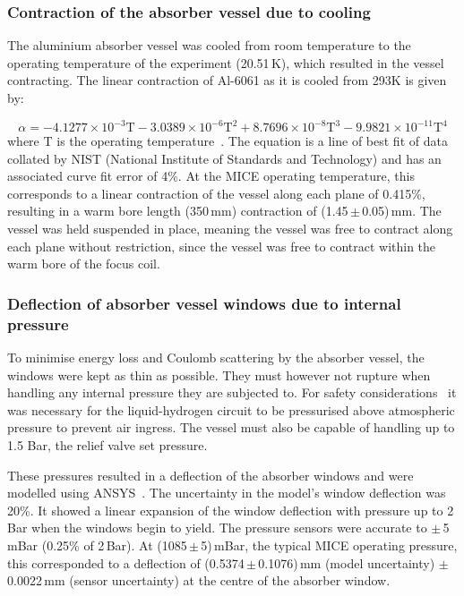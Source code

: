 \subsubsection{Contraction of the absorber vessel due to cooling}
\label{SubSect:Absorber_Contraction}

The aluminium absorber vessel was cooled from room temperature to the operating temperature of the
experiment (20.51\,K), which resulted in the vessel contracting. The linear contraction of
Al-6061 as it is cooled from 293K is given by:

\begin{equation}
  \alpha =-4.1277\times {10}^{-3}\mathrm{T}-3.0389\times {10}^{-6}\mathrm{T}^2+8.7696\times {10}^{-8}\mathrm{T}^3-9.9821\times {10}^{-11}\mathrm{T}^4
\end{equation}
where T is the operating temperature~\cite{Hardin}. The equation is a line of best fit of data collated by NIST
(National Institute of Standards and Technology) and has an associated curve fit error of 4\%.
At the MICE operating temperature, this corresponds to a linear contraction of the vessel along each plane of 0.415\%,
resulting in a warm bore length (350\,mm) contraction of (1.45\,$\mathrm{\pm}$\,0.05)\,mm. The vessel was held suspended in place, meaning the vessel was free to contract along each plane without restriction, since the vessel was free to contract within the warm bore of the focus coil.

\subsubsection{Deflection of absorber vessel windows due to internal pressure}
\label{SubSect:Absorber_pressure}

To minimise energy loss and Coulomb scattering by the absorber vessel, the windows were kept as thin as
possible. They must however not rupture when handling any internal pressure they are subjected to. For
safety considerations~\cite{1748-0221-13-09-T09008}\cite{Ishimoto} it was necessary for the liquid-hydrogen
circuit to be pressurised above atmospheric pressure to prevent air ingress. The vessel must also be
capable of handling up to 1.5 Bar, the relief valve set pressure.

These pressures resulted in a deflection of the absorber windows and were modelled using
ANSYS~\cite{NOTE155}. The uncertainty in the model's window deflection was 20\%. It showed a linear
expansion of the window deflection with pressure up to 2 Bar when the windows begin to yield.
The pressure sensors were accurate to $\mathrm{\pm}$\,5\,mBar (0.25\% of 2\,Bar). At (1085\,$\mathrm{\pm}$\,5)\,mBar, the typical MICE operating pressure, this corresponded to a deflection of (0.5374\,$\mathrm{\pm}$\,0.1076)\,mm (model uncertainty) $\mathrm{\pm}$\,0.0022\,mm (sensor uncertainty) at the centre of
the absorber window.


